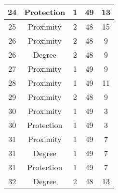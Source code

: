 \documentclass[results.tex]{subfiles}
\begin{document}
\begin{center}
\begin{tabular}{| c || c | c | c | c |}
            \hline
            24                      & Protection                   & 1                      & 49                      & 13                   \\
            \hline
            25                      & Proximity                    & 2                      & 48                      & 15                   \\
            \hline
            26                      & Proximity                    & 2                      & 48                      & 9                    \\
            \hline
            26                      & Degree                       & 2                      & 48                      & 9                    \\
            \hline
            27                      & Proximity                    & 1                      & 49                      & 9                    \\
            \hline
            28                      & Proximity                    & 1                      & 49                      & 11                   \\
            \hline
            29                      & Proximity                    & 2                      & 48                      & 9                    \\
            \hline
            30                      & Proximity                    & 1                      & 49                      & 3                    \\
            \hline
            30                      & Protection                   & 1                      & 49                      & 3                    \\
            \hline
            31                      & Proximity                    & 1                      & 49                      & 7                    \\
            \hline
            31                      & Degree                       & 1                      & 49                      & 7                    \\
            \hline
            31                      & Protection                   & 1                      & 49                      & 7                    \\
            \hline
            32                      & Degree                       & 2                      & 48                      & 13                   \\

\end{tabular}
\end{center}
\end{document}

